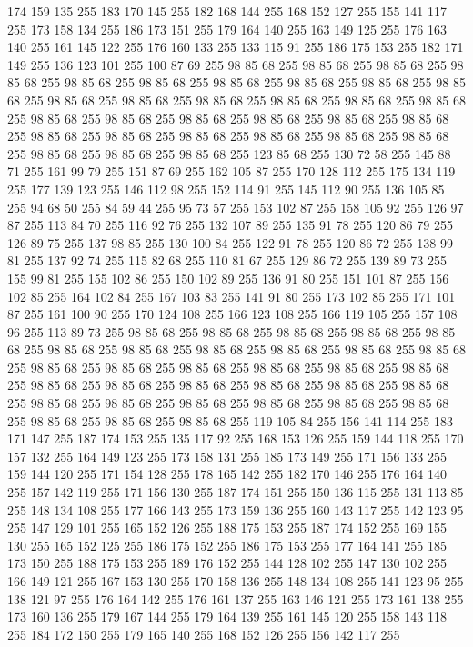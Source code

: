 174 159 135 255 183 170 145 255 182 168 144 255 168 152 127 255 155 141 117 255 173 158 134 255 186 173 151 255 179 164 140 255 163 149 125 255 176 163 140 255 161 145 122 255 176 160 133 255 133 115 91 255 186 175 153 255 182 171 149 255 136 123 101 255 100 87 69 255 98 85 68 255 98 85 68 255 98 85 68 255 98 85 68 255 98 85 68 255 98 85 68 255 98 85 68 255 98 85 68 255 98 85 68 255 98 85 68 255 98 85 68 255 98 85 68 255 98 85 68 255 98 85 68 255 98 85 68 255 98 85 68 255 98 85 68 255 98 85 68 255 98 85 68 255 98 85 68 255 98 85 68 255 98 85 68 255 98 85 68 255 98 85 68 255 98 85 68 255 98 85 68 255 98 85 68 255 98 85 68 255 98 85 68 255 98 85 68 255 98 85 68 255 123 85 68 255 130 72 58 255 145 88 71 255 161 99 79 255 151 87 69 255 162 105 87 255 170 128 112 255 175 134 119 255 177 139 123 255 146 112 98 255 152 114 91 255 145 112 90 255 136 105 85 255 94 68 50 255 84 59 44 255 95 73 57 255
153 102 87 255 158 105 92 255 126 97 87 255 113 84 70 255 116 92 76 255 132 107 89 255 135 91 78 255 120 86 79 255 126 89 75 255 137 98 85 255 130 100 84 255 122 91 78 255 120 86 72 255 138 99 81 255 137 92 74 255 115 82 68 255 110 81 67 255 129 86 72 255 139 89 73 255 155 99 81 255 155 102 86 255 150 102 89 255 136 91 80 255 151 101 87 255 156 102 85 255 164 102 84 255 167 103 83 255 141 91 80 255 173 102 85 255 171 101 87 255 161 100 90 255 170 124 108 255 166 123 108 255 166 119 105 255 157 108 96 255 113 89 73 255 98 85 68 255 98 85 68 255 98 85 68 255 98 85 68 255 98 85 68 255 98 85 68 255 98 85 68 255 98 85 68 255 98 85 68 255 98 85 68 255 98 85 68 255 98 85 68 255 98 85 68 255 98 85 68 255 98 85 68 255 98 85 68 255 98 85 68 255 98 85 68 255 98 85 68 255 98 85 68 255 98 85 68 255 98 85 68 255 98 85 68 255 98 85 68 255 98 85 68 255 98 85 68 255 98 85 68 255 98 85 68 255
98 85 68 255 98 85 68 255 98 85 68 255 98 85 68 255 119 105 84 255 156 141 114 255 183 171 147 255 187 174 153 255 135 117 92 255 168 153 126 255 159 144 118 255 170 157 132 255 164 149 123 255 173 158 131 255 185 173 149 255 171 156 133 255 159 144 120 255 171 154 128 255 178 165 142 255 182 170 146 255 176 164 140 255 157 142 119 255 171 156 130 255 187 174 151 255 150 136 115 255 131 113 85 255 148 134 108 255 177 166 143 255 173 159 136 255 160 143 117 255 142 123 95 255 147 129 101 255 165 152 126 255 188 175 153 255 187 174 152 255 169 155 130 255 165 152 125 255 186 175 152 255 186 175 153 255 177 164 141 255 185 173 150 255 188 175 153 255 189 176 152 255 144 128 102 255 147 130 102 255 166 149 121 255 167 153 130 255 170 158 136 255 148 134 108 255 141 123 95 255 138 121 97 255 176 164 142 255 176 161 137 255 163 146 121 255 173 161 138 255 173 160 136 255 179 167 144 255 179 164 139 255 161 145 120 255 158 143 118 255 184 172 150 255 179 165 140 255 168 152 126 255 156 142 117 255
